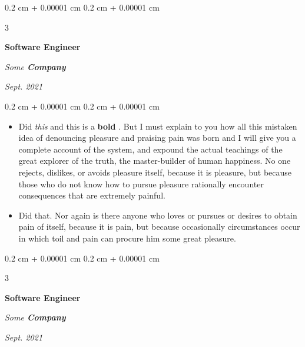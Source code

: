 \documentclass[10pt, letterpaper]{article}
\newenvironment{highlights}{
    \begin{itemize}[
        topsep=0.10 cm,
        parsep=0.10 cm,
        partopsep=0pt,
        itemsep=0pt,
        leftmargin=0.4 cm + 10pt + 0.6 cm
    ]
}{
    \end{itemize}
} %
\newenvironment{onecolentry}{
    \begin{adjustwidth}{
        0.2 cm + 0.00001 cm
    }{
        0.2 cm + 0.00001 cm
    }
}{
    \end{adjustwidth}
} %
\newenvironment{threecolentry}[3][]{
    \onecolentry
    \def\thirdColumn{#3}
    \setcolumnwidth{0.6 cm, \fill, 4.5 cm}
    \begin{paracol}{3}
    #2 \switchcolumn
}{
    \switchcolumn \raggedleft \thirdColumn
    \end{paracol}
    \endonecolentry
} %
\let\hrefWithoutArrow\href
\renewcommand{\href}[2]{\hrefWithoutArrow{#1}{\mbox{\ifthenelse{\equal{#2}{}}{ }{#2 }\raisebox{.15ex}{\footnotesize \faExternalLink*}}}}
\begin{document}
        \vspace{0.2 cm-3px}

        \begin{threecolentry}{
            \vspace*{\fill}
            \textbullet
            \vspace*{3px}
            \vspace*{\fill}
        }{
            
            
        \textit{Sept. 2021}}
            \textbf{Software Engineer}
            
            \textit{Some \textbf{Company}}
        \end{threecolentry}

        \vspace{0.10 cm-3px}
        \begin{onecolentry}
            \begin{highlights}
                \item Did \textit{this} and this is a \textbf{bold} \href{https://example.com}{link}. But I must explain to you how all this mistaken idea of denouncing pleasure and praising pain was born and I will give you a complete account of the system, and expound the actual teachings of the great explorer of the truth, the master-builder of human happiness. No one rejects, dislikes, or avoids pleasure itself, because it is pleasure, but because those who do not know how to pursue pleasure rationally encounter consequences that are extremely painful.
                \item Did that. Nor again is there anyone who loves or pursues or desires to obtain pain of itself, because it is pain, but because occasionally circumstances occur in which toil and pain can procure him some great pleasure.
            \end{highlights}
        \end{onecolentry}


        \vspace{0.2 cm-3px}

        \begin{threecolentry}{
            \vspace*{\fill}
            \textbullet
            \vspace*{3px}
            \vspace*{\fill}
        }{
            
            
        \textit{Sept. 2021}}
            \textbf{Software Engineer}
            
            \textit{Some \textbf{Company}}
        \end{threecolentry}
\end{document}
